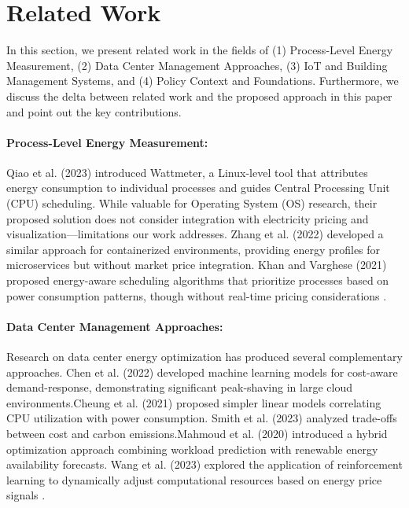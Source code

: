 

\section{Related Work}
In this section, we present related work in the fields of (1) Process-Level Energy Measurement, (2) Data Center Management Approaches, (3) IoT and Building Management Systems, and (4) Policy Context and Foundations.
Furthermore, we discuss the delta between related work and the proposed approach in this paper and point out the key contributions.

\paragraph{\textbf{Process-Level Energy Measurement:}}
Qiao et al. (2023) introduced Wattmeter, a Linux-level tool that attributes energy consumption to
individual processes and guides Central Processing Unit (CPU) scheduling. While valuable for Operating System (OS) research, their proposed solution does not consider
integration with electricity pricing and visualization—limitations our work addresses.
Zhang et al. (2022) developed a similar approach for containerized environments, providing energy
profiles for microservices but without market price integration. Khan and Varghese (2021) proposed
energy-aware scheduling algorithms that prioritize processes based on power consumption patterns,
though without real-time pricing considerations \cite{qiao2023wattmeter,zhang2022container,khan2021energy}.

\newpage
\paragraph{\textbf{Data Center Management Approaches:}}
Research on data center energy optimization has produced several complementary approaches.
Chen et al. (2022) developed machine learning models for cost-aware demand-response, demonstrating
significant peak-shaving in large cloud environments.Cheung et al. (2021) proposed simpler linear
models correlating CPU utilization with power consumption. Smith et al. (2023) analyzed trade-offs
between cost and carbon emissions.Mahmoud et al. (2020) introduced a hybrid optimization approach
combining workload prediction with renewable energy availability forecasts. Wang et al. (2023) explored the application of reinforcement learning to dynamically adjust
computational resources based on energy price signals \cite{chen2022datacentermodel,cheung2021utilizationmodel,smith2023warofefficiencies,mahmoud2020cost,wang2023reinforcement}.


